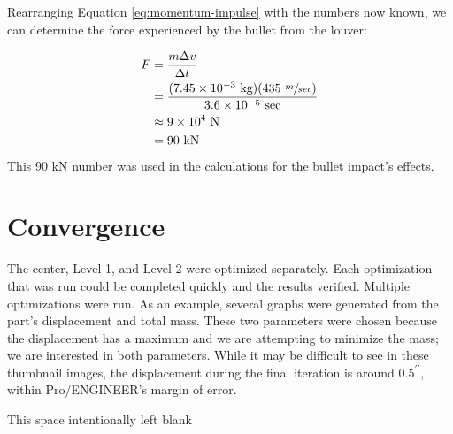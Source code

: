 \documentclass[12pt,letterpaper]{report}
\providecommand{\e}[1]{\ensuremath{\times 10^{#1}}} %
\newcommand{\inchsign}{^{\prime\prime}} %
\begin{document}
		Rearranging Equation \ref{eq:momentum-impulse} with the numbers now known, we can determine the force experienced by the bullet from the louver:
		
		\begin{align*}
		F &= \frac{m \Delta v}{\Delta t}\\
		&=\frac{(7.45\e{-3}\textrm{ kg})(435 \textrm{ } \sfrac{m}{sec})}{3.6\e{-5} \textrm{ sec}}\\
		&\approx 9\e{4} \textrm{ N}\\
		&= 90 \textrm{ kN}
		\end{align*}
		
		This 90 kN number was used in the calculations for the bullet impact's effects.
		
		\newpage
		\section{Convergence}
		The center, Level 1, and Level 2 were optimized separately.  Each optimization that was run could be completed quickly and the results verified.  Multiple optimizations were run.  As an example, several graphs were generated from the part's displacement and total mass.  These two parameters were chosen because the displacement has a maximum and we are attempting to minimize the mass; we are interested in both parameters.  While it may be difficult to see in these thumbnail images, the displacement during the final iteration is around $0.5\inchsign$, within Pro/ENGINEER's margin of error.
		
		\begin{center}
			\vfill
			\begin{scriptsize}
				This space intentionally left blank
			\end{scriptsize}
		\end{center}
		
		\newpage
\end{document}
